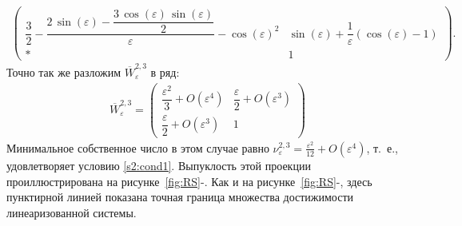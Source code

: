 \documentclass[../main.tex]{subfiles}
\begin{document}
\begin{enumerate}
\begin{gather*}
\begin{pmatrix}
 \dfrac{3}{2}-\dfrac{2\,\sin\left(\varepsilon \right)-\dfrac{3\,\cos\left(\varepsilon \right)\,\sin\left(\varepsilon \right)}{2}}{\varepsilon }-{\cos\left(\varepsilon \right)}^2 & \sin\left(\varepsilon \right)+\dfrac{1}{\varepsilon } \left(\cos\left(\varepsilon \right)-1 \right)\\[8pt]
 * & 
 1 
 \end{pmatrix}.
 \end{gather*}
 Точно так же разложим $ \overline{W}_{\varepsilon}^{2,3} $ в ряд:
 \begin{gather*}
 \overline{W}_{\varepsilon}^{2,3} = \begin{pmatrix}
 \dfrac{\varepsilon^2}{3} + O(\varepsilon^4) &
 \dfrac{\varepsilon }{2} + O(\varepsilon^3) \\[8pt]
 \dfrac{\varepsilon }{2} + O(\varepsilon^3) & 1
 \end{pmatrix}
 \end{gather*}
 Минимальное собственное число в этом случае равно $ \nu^{2,3}_{\varepsilon} = \frac{\varepsilon^2}{12} + O(\varepsilon^4) $, т.~е., удовлетворяет условию \eqref{s2:cond1}. 
Выпуклость этой проекции проиллюстрирована на рисунке~\ref{fig:RS}-. 
Как и на рисунке~\ref{fig:RS}-, здесь пунктирной линией показана точная граница множества достижимости линеаризованной системы.
 \end{enumerate}
\end{document}
